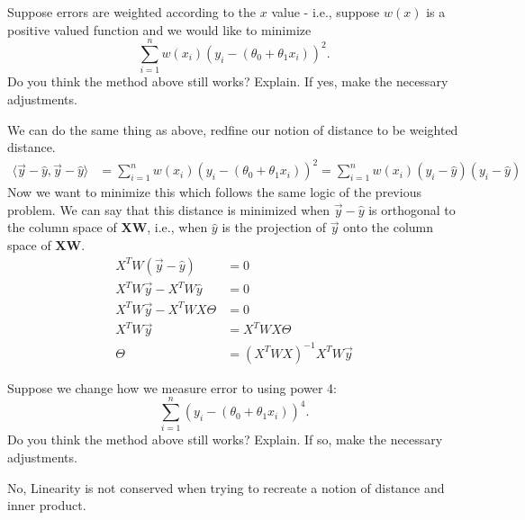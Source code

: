 \documentclass[answers,12pt,addpoints]{exam}
\begin{document}
\begin{questions}
    \question Suppose errors are weighted according to the $x$ value - i.e., suppose $w(x)$ is a positive valued function and we would like to minimize
    \[
    \sum_{i=1}^n w(x_i) (y_i - (\theta_0 + \theta_1 x_i))^2.
    \]
    Do you think the method above still works? Explain. If yes, make the necessary adjustments.
    \begin{solution}
        We can do the same thing as above, redfine our notion of distance to be weighted distance.
        \begin{align*}
            \langle \vec{y} - \hat{y}, \vec{y} - \hat{y} \rangle &= \sum_{i=1}^n w(x_i) (y_i - (\theta_0 + \theta_1 x_i))^2 = \sum_{i=1}^n w(x_i) (y_i - \hat{y})(y_i - \hat{y}) 
        \end{align*}
        Now we want to minimize this which follows the same logic of the previous problem. We can say that this distance is minimized when $\vec{y} - \hat{y}$ is orthogonal to the column space of $\mathbf{XW}$, i.e., when $\hat{y}$ is the projection of $\vec{y}$ onto the column space of $\mathbf{XW}$.
        \begin{align*}
            X^T W (\vec{y} - \hat{y}) &= 0 \\
            X^T W \vec{y} - X^T W \hat{y} &= 0 \\
            X^T W \vec{y} - X^T W X \Theta &= 0 \\
            X^T W \vec{y} &= X^T W X \Theta \\
            \Theta &= (X^T W X)^{-1} X^T W \vec{y}
        \end{align*}
    \end{solution}
    \question Suppose we change how we measure error to using power 4: 
    \[
    \sum_{i=1}^n (y_i - (\theta_0 + \theta_1 x_i))^4.
    \]
    Do you think the method above still works? Explain. If so, make the necessary adjustments.
    \begin{solution}
        No, Linearity is not conserved when trying to recreate a notion of distance and inner product.
    \end{solution}



\end{questions}
\end{document}
